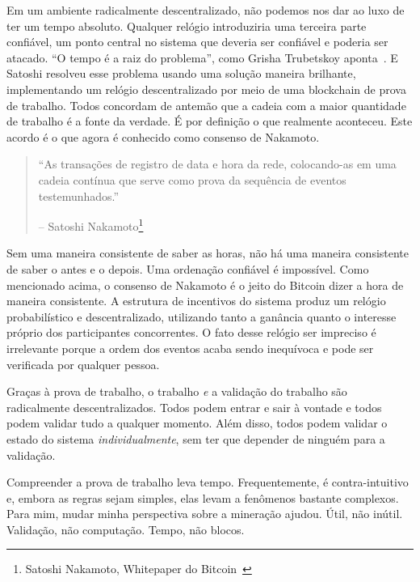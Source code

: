 Em um ambiente radicalmente descentralizado, não podemos nos dar ao luxo de ter um tempo absoluto. Qualquer relógio introduziria uma terceira parte confiável, um ponto central no sistema que deveria ser confiável e poderia ser atacado. \enquote{O tempo é a raiz do problema}, como Grisha Trubetskoy aponta~\cite{pow-clock}. E Satoshi resolveu esse problema usando uma solução maneira brilhante, implementando um relógio descentralizado por meio de uma blockchain de prova de trabalho. Todos concordam de antemão que a cadeia com a maior quantidade de trabalho é a fonte da verdade. É por definição o que realmente aconteceu. Este acordo é o que agora é conhecido como consenso de Nakamoto.

\begin{quotation}\begin{samepage}
\enquote{As transações de registro de data e hora da rede, colocando-as em uma cadeia contínua que serve como prova da sequência de eventos testemunhados.}
\begin{flushright} -- Satoshi Nakamoto\footnote{Satoshi Nakamoto, Whitepaper do Bitcoin~\cite{whitepaper}}
\end{flushright}\end{samepage}\end{quotation}

Sem uma maneira consistente de saber as horas, não há uma maneira consistente de saber o antes e o depois. Uma ordenação confiável é impossível. Como mencionado acima, o consenso de Nakamoto é o jeito do Bitcoin dizer a hora de maneira consistente. A estrutura de incentivos do sistema produz um relógio probabilístico e descentralizado, utilizando tanto a ganância quanto o interesse próprio dos participantes concorrentes. O fato desse relógio ser impreciso é irrelevante porque a ordem dos eventos acaba sendo inequívoca e pode ser verificada por qualquer pessoa.

Graças à prova de trabalho, o trabalho \textit{e} a validação do trabalho são radicalmente descentralizados. Todos podem entrar e sair à vontade e todos podem validar tudo a qualquer momento. Além disso, todos podem validar o estado do sistema \textit{individualmente}, sem ter que depender de ninguém para a validação.

Compreender a prova de trabalho leva tempo. Frequentemente, é contra-intuitivo e, embora as regras sejam simples, elas levam a fenômenos bastante complexos. Para mim, mudar minha perspectiva sobre a mineração ajudou. Útil, não inútil. Validação, não computação. Tempo, não blocos.

